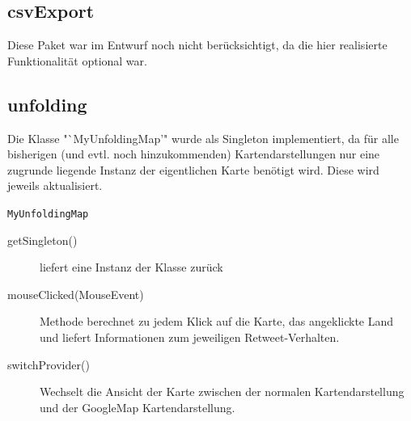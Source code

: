 \subsection{csvExport}
Diese Paket war im Entwurf noch nicht berücksichtigt, da die hier realisierte Funktionalität optional war.
\subsection{unfolding} 
Die Klasse "`MyUnfoldingMap'" wurde als Singleton implementiert, da für alle bisherigen (und evtl. noch hinzukommenden) Kartendarstellungen nur eine zugrunde liegende Instanz der eigentlichen Karte benötigt wird. Diese wird jeweils aktualisiert.
\begin{description}
	\item \lstinline{MyUnfoldingMap}
	\begin{description}
			\item[getSingleton()] liefert eine Instanz der Klasse zurück
			\item[mouseClicked(MouseEvent)] Methode berechnet zu jedem Klick auf die Karte, das angeklickte Land und liefert Informationen zum jeweiligen Retweet-Verhalten.
			\item[switchProvider()] Wechselt die Ansicht der Karte zwischen der normalen Kartendarstellung und der GoogleMap Kartendarstellung.
	\end{description}
\end{description}
	
